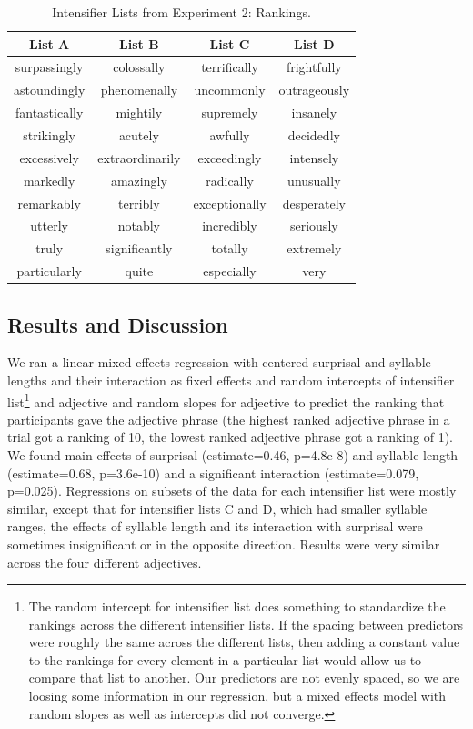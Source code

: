 \documentclass[10pt,letterpaper]{article}
\begin{document}
\begin{table}[ht]
\begin{center} 
\footnotesize
\caption{Intensifier Lists from Experiment 2: Rankings.} 
\label{exp2-intensifiers} 
\vskip 0.12in
\begin{tabular}{cccc} 
\hline
List A    &  List B & List C & List D \\
\hline
surpassingly & colossally & terrifically & frightfully \\
astoundingly & phenomenally & uncommonly & outrageously \\
fantastically & mightily & supremely & insanely \\
strikingly & acutely & awfully & decidedly \\
excessively & extraordinarily & exceedingly & intensely \\
markedly & amazingly & radically & unusually \\
remarkably & terribly & exceptionally & desperately \\
utterly & notably & incredibly & seriously \\
truly & significantly & totally & extremely \\
particularly & quite & especially & very
\end{tabular}
\end{center}
\end{table}

\subsection{Results and Discussion}

We ran a linear mixed effects regression with centered surprisal and syllable lengths and their interaction as fixed effects and random intercepts of intensifier list\footnote{The random intercept for intensifier list does something to standardize the rankings across the different intensifier lists. If the spacing between predictors were roughly the same across the different lists, then adding a constant value to the rankings for every element in a particular list would allow us to compare that list to another. Our predictors are not evenly spaced, so we are loosing some information in our regression, but a mixed effects model with random slopes as well as intercepts did not converge.} and adjective and random slopes for adjective to predict the ranking that participants gave the adjective phrase (the highest ranked adjective phrase in a trial got a ranking of 10, the lowest ranked adjective phrase got a ranking of 1). We found main effects of surprisal (estimate=0.46, p=4.8e-8) and syllable length (estimate=0.68, p=3.6e-10) and a significant interaction (estimate=0.079, p=0.025). Regressions on subsets of the data for each intensifier list were mostly similar, except that for intensifier lists C and D, which had smaller syllable ranges, the effects of syllable length and its interaction with surprisal were sometimes insignificant or in the opposite direction. Results were very similar across the four different adjectives.
\end{document}
